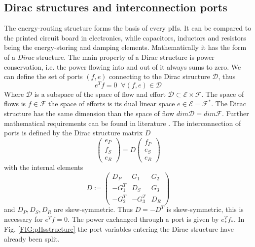 \documentclass[a4paper,twoside, openright,12pt]{report}
\begin{document}
\subsection{Dirac structures and interconnection ports} \label{SS:PHSinterconnection}
The energy-routing structure forms the basis of every pHs. It can be compared to the printed circuit board in electronics, while capacitors, inductors and resistors being the energy-storing and damping elements. Mathematically it has the form of a \emph{Dirac} structure. The main property of a Dirac structure is power conservation, i.e. the power flowing into and out of it always sums to zero. We can define the set of ports $(f,e)$ connecting to the Dirac structure $\mathcal{D}$, thus 
\begin{equation}
e^Tf = 0 \;  \; \forall (f,e)\in\mathcal{D}
\end{equation}
Where $\mathcal{D}$ is a subspace of the space of flow and effort $\mathcal{D} \subset \mathcal{E}\times \mathcal{F}$. The space of flows is $f \in \mathcal{F}$ the space of efforts is its dual linear space $e \in \mathcal{E} = \mathcal{F}^*$. The Dirac structure has the same dimension than the space of flow $dim \mathcal{D} = dim \mathcal{F}$.
Further mathematical requirements can be found in literature \cite{vanderSchaft_06,Schaft14}. The interconnection of ports is defined by the Dirac structure matrix $D$
\begin{equation}
\begin{pmatrix}
e_P \\ f_S \\ e_R
\end{pmatrix} = D \begin{pmatrix}
f_P \\ e_S \\ e_R
\end{pmatrix}
\end{equation}
with the internal elements
\begin{equation}
D :=  \begin{pmatrix}
D_P & G_1 & G_2 \\ -G_1^T & D_S & G_3 \\ -G_2^T & -G_3^T & D_R 
\end{pmatrix}
\end{equation}
and $D_P,D_S,D_R$ are skew-symmetric. Thus $D = -D^T$ is skew-symmetric, this is necessary for $e^Tf=0$.
The power exchanged through a port is given by $ e_*^Tf_*$. In Fig. \ref{FIG:pHsstructure} the port variables entering the Dirac structure have already been split. 
\end{document}
